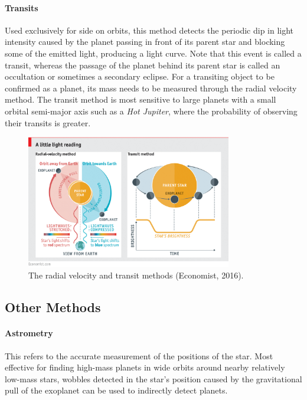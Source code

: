 \documentclass[11pt]{article}
\begin{document}
\hypertarget{transits}{%
\paragraph{Transits}\label{transits}}

Used exclusively for side on orbits, this method detects the periodic
dip in light intensity caused by the planet passing in front of its
parent star and blocking some of the emitted light, producing a light
curve. Note that this event is called a transit, whereas the passage of
the planet behind its parent star is called an occultation or sometimes
a secondary eclipse. For a transiting object to be confirmed as a
planet, its mass needs to be measured through the radial velocity
method. The transit method is most sensitive to large planets with a
small orbital semi-major axis such as a \emph{Hot Jupiter}, where the
probability of observing their transits is greater.

\quad
\begin{figure}[!ht]
	\centering
	\includegraphics[width=0.8\textwidth]{../images/methods.png}
	\caption{The radial velocity and transit methods (Economist, 2016).} \label{Figure 1.a}
\end{figure}


\hypertarget{other-methods}{%
\subsection{Other Methods}\label{other-methods}}

\hypertarget{astrometry}{%
\paragraph{Astrometry}\label{astrometry}}

This refers to the accurate measurement of the positions of the star.
Most effective for finding high-mass planets in wide orbits around
nearby relatively low-mass stars, wobbles detected in the star's
position caused by the gravitational pull of the exoplanet can be used
to indirectly detect planets.
\end{document}
